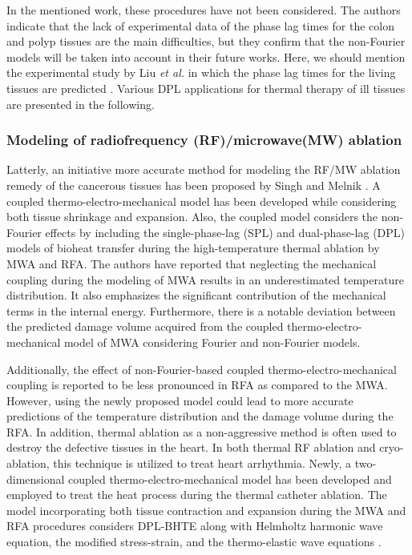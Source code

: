 \documentclass[sn-mathphys]{sn-jnl}%
\theoremstyle{thmstyleone}%
\theoremstyle{thmstyletwo}%
\theoremstyle{thmstylethree}%
\begin{document}
{In the mentioned work, these procedures have not been considered. The authors indicate that the lack of experimental data of the phase lag times for the colon and polyp tissues are the main difficulties, but they confirm that the non-Fourier models will be taken into account in their future works. Here, we should mention the experimental study by Liu \emph{et al.} in which the phase lag times for the living tissues are predicted \cite{CLi2018}. Various DPL applications for thermal therapy of ill tissues are presented in the following.

\subsubsection{Modeling of radiofrequency (RF)/microwave(MW) ablation}
Latterly, an initiative more accurate method for modeling the RF/MW ablation remedy of the cancerous tissues has been proposed by Singh and Melnik \cite{Singh2019,Singh20202}. A coupled thermo-electro-mechanical model has been developed while considering both tissue shrinkage and expansion. Also, the coupled model considers the non-Fourier effects by including the single-phase-lag (SPL) and dual-phase-lag (DPL) models of bioheat transfer during the high-temperature thermal ablation by MWA and RFA. The authors have reported that neglecting the mechanical coupling during the modeling of MWA results in an underestimated temperature distribution. It also emphasizes the significant contribution of the mechanical terms in the internal energy. Furthermore, there is a notable deviation between the predicted damage volume acquired from the coupled thermo-electro-mechanical model of MWA considering Fourier and non-Fourier models. 

Additionally, the effect of non-Fourier-based coupled thermo-electro-mechanical coupling is reported to be less pronounced in RFA as compared to the MWA. However, using the newly proposed model could lead to more accurate predictions of the temperature distribution and the damage volume during the RFA. In addition, thermal ablation as a non-aggressive method is often used to destroy the defective tissues in the heart. In both thermal RF ablation and cryo-ablation, this technique is utilized to treat heart arrhythmia. Newly, a two-dimensional coupled thermo-electro-mechanical model has been developed and employed to treat the heat process during the thermal catheter ablation. The model incorporating both tissue contraction and expansion during the MWA and RFA procedures considers DPL-BHTE along with Helmholtz harmonic wave equation, the modified stress-strain, and the thermo-elastic wave equations \cite{Singh2019}.

}
\end{document}
